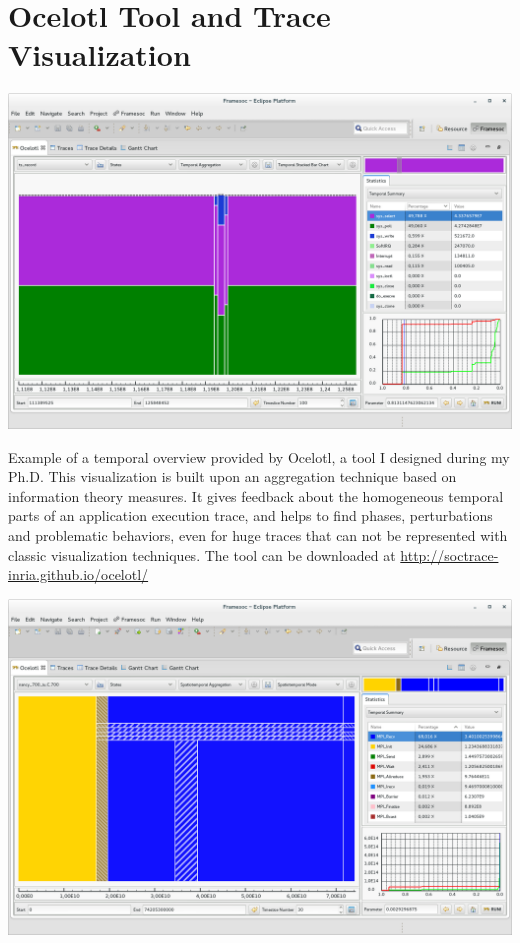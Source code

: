 \section{Ocelotl Tool and Trace Visualization}
\vfill
\begin{minipage}[c]{0.60\textwidth}
  \includegraphics[width=\textwidth]{img/ocelotlt}
\end{minipage}
\hfill
\begin{minipage}[c]{0.38\textwidth}
  Example of a temporal overview provided by Ocelotl, a tool I 
designed during my Ph.D. This visualization is built upon an aggregation 
technique based on information theory measures. It gives feedback about the 
homogeneous temporal parts of an application execution trace, and helps to find 
phases, perturbations and problematic behaviors, even for huge traces that can 
not be represented with classic visualization techniques. The tool can be 
downloaded at
\href{http://soctrace-inria.github.io/ocelotl/}{
http://soctrace-inria.github.io/ocelotl/}
\end{minipage}
\vfill
\begin{minipage}[c]{0.60\textwidth}
 \includegraphics[width=\textwidth]{img/ocelotlst}
\end{minipage}
